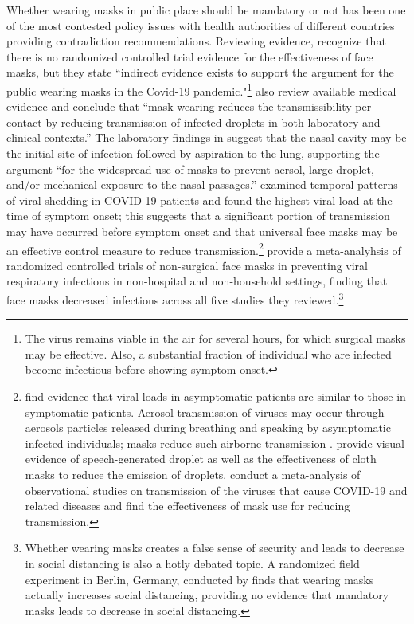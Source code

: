 \documentclass[11pt,reqno,letter]{amsart}
\theoremstyle{definition}
\begin{document}
Whether wearing  masks in public place should be mandatory or not has been one of the most contested policy issues with health authorities of different countries providing contradiction recommendations. Reviewing evidence, \cite{Greenhalghm2020}  recognize that there is no randomized controlled trial evidence for the effectiveness of face masks,  but they state ``indirect evidence exists to support the argument for the public wearing masks in the Covid-19 pandemic."\footnote{The virus remains viable in the air for several hours, for which surgical masks may be effective. Also, a substantial fraction of individual who are infected become infectious before showing symptom onset.}
\cite{howard2020} also review available medical evidence and conclude that ``mask wearing reduces the transmissibility per contact by reducing transmission of infected droplets in both laboratory and clinical contexts.''  The laboratory findings in \cite{hou2020} suggest that the nasal cavity may be the initial site of infection followed by aspiration to the lung, supporting the argument  ``for the widespread use of masks to prevent aersol, large droplet, and/or mechanical exposure to the nasal passages.''   \cite{He2020} examined temporal patterns of viral shedding in COVID-19 patients and found the highest viral load at the time of symptom onset; this suggests that a significant portion of transmission may have occurred before symptom onset and that universal face masks may be an effective control measure to reduce transmission.\footnote{\cite{Lee2020} find evidence that viral loads in asymptomatic patients are similar to those in symptomatic patients. Aerosol transmission of viruses may occur through aerosols particles released during breathing and speaking by asymptomatic infected individuals; masks reduce such airborne transmission \citep{Prather2020}. \cite{Anfinrud2020} provide visual evidence of speech-generated droplet as well as the effectiveness of cloth masks to reduce the emission of droplets.   \cite{Chu2020} conduct a meta-analysis of observational studies on transmission of the viruses that cause COVID-19 and related diseases and find the effectiveness of mask use for reducing transmission. } \cite{ollila2020} provide a meta-analyhsis of randomized controlled trials of non-surgical face masks in preventing viral respiratory infections in non-hospital and non-household settings, finding that face masks decreased infections across all five studies they reviewed.\footnote{Whether wearing masks creates a false sense of security and leads to decrease in social distancing is also a hotly debated topic.  A randomized field experiment in Berlin, Germany, conducted by \cite{seres2020}  finds that wearing masks actually increases social distancing, providing no evidence that mandatory masks leads to decrease in social distancing.}
\end{document}
